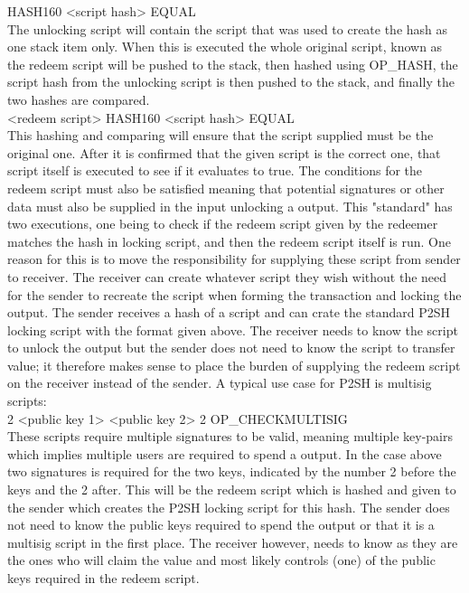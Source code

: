 HASH160 <script hash> EQUAL
\\

The unlocking script will contain the script that was used to create the hash as one stack item only. When this is executed the whole original script, known as the redeem script will be pushed to the stack, then hashed using OP\_HASH, the script hash from the unlocking script is then pushed to the stack, and finally the two hashes are compared.
\\

<redeem script> HASH160 <script hash> EQUAL
\\

This hashing and comparing will ensure that the script supplied must be the original one. After it is confirmed that the given script is the correct one, that script itself is executed to see if it evaluates to true. The conditions for the redeem script must also be satisfied meaning that potential signatures or other data must also be supplied in the input unlocking a output. This "standard" has two executions, one being to check if the redeem script given by the redeemer matches the hash in locking script, and then the redeem script itself is run.
One reason for this is to move the responsibility for supplying these script from sender to receiver. The receiver can create whatever script they wish without the need for the sender to recreate the script when forming the transaction and locking the output. The sender receives a hash of a script and can crate the standard P2SH locking script with the format given above. The receiver needs to know the script to unlock the output but the sender does not need to know the script to transfer value; it therefore makes sense to place the burden of supplying the redeem script on the receiver instead of the sender. A typical use case for P2SH is multisig scripts: 
\\

2 <public key 1> <public key 2> 2 OP\_CHECKMULTISIG
\\

These scripts require multiple signatures to be valid, meaning multiple key-pairs which implies multiple users are required to spend a output.
In the case above two signatures is required for the two keys, indicated by the number 2 before the keys and the 2 after.
This will be the redeem script which is hashed and given to the sender which creates the P2SH locking script for this hash.
The sender does not need to know the public keys required to spend the output or that it is a multisig script in the first place. The receiver however, needs to know as they are the ones who will claim the value and most likely controls (one) of the public keys required in the redeem script.

